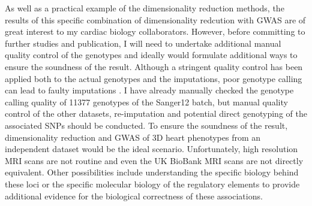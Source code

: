 As well as a practical example of the dimensionality reduction methods, the results of this specific combination of dimensionality redcution with GWAS are of great interest to my cardiac biology collaborators. However, before committing to further studies and publication, I will need to undertake additional manual quality control of the genotypes and ideally  would formulate additional ways to ensure the soundness of the result. Although a stringent quality control has been applied both to the actual genotypes and the imputations, poor genotype calling can lead to faulty imputations \citep{Morris2010}. I have already manually checked the genotype calling quality of \num{11377} genotypes of the Sanger12 batch, but manual quality control of the other datasets, re-imputation and potential direct genotyping of the associated SNPs should be conducted. To ensure the soundness of the result, dimensionality reduction and GWAS of 3D heart phenotypes from an independent dataset would be the ideal scenario. Unfortunately, high resolution MRI scans are not routine and even the UK BioBank MRI scans are not directly equivalent. Other possibilities include understanding the specific biology behind these loci or the specific molecular biology of the regulatory elements to provide additional evidence for the biological correctness of these associations.

